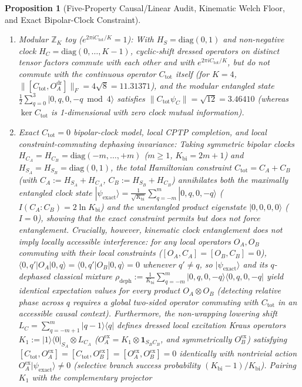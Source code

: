 \documentclass[11pt,a4paper]{article}
\newtheorem{proposition}{Proposition}
\theoremstyle{definition}
\theoremstyle{remark}
\newcommand{\bbZ}{\mathbb{Z}}
\newcommand{\1}{\mathbf{1}}
\begin{document}
\begin{proposition}[Five-Property Causal/Linear Audit, Kinematic Welch Floor, and Exact Bipolar-Clock Constraint]
\begin{enumerate}
\begin{enumerate}
    \item[(C.1)] \emph{Modular $\bbZ_K$ toy ($e^{2\pi i C_{\mathrm{tot}}/K}=1$):} With $H_S=\mathrm{diag}(0,1)$ and non-negative clock $H_C=\mathrm{diag}(0,\dots,K-1)$, cyclic-shift dressed operators on distinct tensor factors commute with each other and with $e^{2\pi i C_{\mathrm{tot}}/K}$, but do \emph{not} commute with the continuous operator $C_{\mathrm{tot}}$ itself (for $K=4$, $\|[C_{\mathrm{tot}},O_A^{\mathrm{dr}}]\|_F=4\sqrt{8}=11.31371$), and the modular entangled state $\frac{1}{2}\sum_{q=0}^3|0,q,0,-q\bmod 4\rangle$ satisfies $\|C_{\mathrm{tot}}\psi_C\|=\sqrt{12}=3.46410$ (whereas $\ker C_{\mathrm{tot}}$ is 1-dimensional with zero clock mutual information).
    \item[(C.2)] \emph{Exact $C_{\mathrm{tot}}=0$ bipolar-clock model, local CPTP completion, and local constraint-commuting dephasing invariance:} Taking symmetric bipolar clocks $H_{C_A}=H_{C_B}=\mathrm{diag}(-m,\dots,+m)$ ($m\ge 1$, $K_{\mathrm{bi}}=2m+1$) and $H_{S_A}=H_{S_B}=\mathrm{diag}(0,1)$, the total Hamiltonian constraint $C_{\mathrm{tot}}=C_A+C_B$ (with $C_A:=H_{S_A}+H_{C_A}$, $C_B:=H_{S_B}+H_{C_B}$) annihilates \emph{both} the maximally entangled clock state $|\psi_{\mathrm{exact}}\rangle=\frac{1}{\sqrt{K_{\mathrm{bi}}}}\sum_{q=-m}^m|0,q,0,-q\rangle$ ($I(C_A:C_B)=2\ln K_{\mathrm{bi}}$) \emph{and} the unentangled product eigenstate $|0,0,0,0\rangle$ ($I=0$), showing that the exact constraint permits but does not force entanglement. Crucially, however, kinematic clock entanglement does \emph{not} imply locally accessible interference: for any local operators $O_A,O_B$ commuting with their local constraints ($[O_A,C_A]=[O_B,C_B]=0$), $\langle 0,q'|O_A|0,q\rangle=\langle 0,q'|O_B|0,q\rangle=0$ whenever $q'\neq q$, so $|\psi_{\mathrm{exact}}\rangle$ and its $q$-dephased classical mixture $\rho_{\mathrm{deph}}:=\frac{1}{K_{\mathrm{bi}}}\sum_{q=-m}^m|0,q,0,-q\rangle\langle 0,q,0,-q|$ yield identical expectation values for every product $O_A\otimes O_B$ (detecting relative phase across $q$ requires a global two-sided operator commuting with $C_{\mathrm{tot}}$ in an accessible causal context). Furthermore, the non-wrapping lowering shift $L_C=\sum_{q=-m+1}^m|q-1\rangle\langle q|$ defines dressed local excitation Kraus operators $K_1:=|1\rangle\langle 0|_{S_A}\otimes L_{C_A}$ ($O_A^{\mathrm{ex}}=K_1\otimes\1_{S_B C_B}$, and symmetrically $O_B^{\mathrm{ex}}$) satisfying $[C_{\mathrm{tot}},O_A^{\mathrm{ex}}]=[C_{\mathrm{tot}},O_B^{\mathrm{ex}}]=[O_A^{\mathrm{ex}},O_B^{\mathrm{ex}}]=0$ identically with nontrivial action $O_A^{\mathrm{ex}}|\psi_{\mathrm{exact}}\rangle\neq 0$ (selective branch success probability $(K_{\mathrm{bi}}-1)/K_{\mathrm{bi}}$). Pairing $K_1$ with the complementary projector

\end{enumerate}
\end{enumerate}
\end{proposition}
\end{document}
